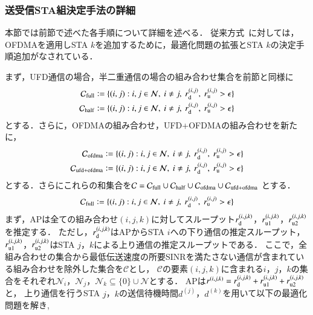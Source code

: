 \documentclass[master]{kuisthesis}		%
\newcommand{\sij}{(i,j)}
\def\coloneqq{\mathrel{\mathop:}=}
\newcommand{\sijk}{(i,j,k)}
\newcommand{\rijk}{r^{(i,j,k)}}
\newcommand{\mthc}{\mathcal C}
\newcommand{\mthni}{{\mathcal N}_i}
\newcommand{\mthnj}{{\mathcal N}_j}
\newcommand{\mthnk}{{\mathcal N}_k}
\begin{document}
		\subsubsection{送受信STA組決定手法の詳細}
			本節では前節で述べた各手順について詳細を述べる．
			従来方式~\cite{promac_fair}に対しては，OFDMAを適用しSTA $k$を追加するために，最適化問題の拡張とSTA $k$の決定手順追加がなされている．
			\par
			まず，UFD通信の場合，半二重通信の場合の組み合わせ集合を前節と同様に
			\begin{align}
				{\mathcal C}_{\rm full} \coloneqq \{\sij : i,j\in{\mathcal N},\ i\neq j,\ r^{\sij}_{\rm d},\ r^{\sij}_{\rm u}>\epsilon\} \label{eq:cfull}\\
				{\mathcal C}_{\rm half} \coloneqq \{\sij : i,j\in{\mathcal N},\ i\neq j,\ r^{\sij}_{\rm d},\ r^{\sij}_{\rm u}>\epsilon\} \label{eq:cfull}
			\end{align}
			とする．さらに，OFDMAの組み合わせ，UFD+OFDMAの組み合わせを新たに，
			\begin{align}
				{\mathcal C}_{\rm ofdma} \coloneqq \{\sij : i,j\in{\mathcal N},\ i\neq j,\ r^{\sij}_{\rm d},\ r^{\sij}_{\rm u}>\epsilon\} \label{eq:cfull}\\
				{\mathcal C}_{\rm ufd+ofdma} \coloneqq \{\sij : i,j\in{\mathcal N},\ i\neq j,\ r^{\sij}_{\rm d},\ r^{\sij}_{\rm u}>\epsilon\} \label{eq:cfull}
			\end{align}
			とする．さらにこれらの和集合を${\mathcal C} = {\mathcal C}_{\rm full} \cup {\mathcal C}_{\rm half}\cup {\mathcal C}_{\rm ofdma}\cup {\mathcal C}_{\rm ufd+ofdma}$
			とする．
			\begin{equation}
				{\mathcal C}_{\rm full} \coloneqq \{\sij : i,j\in{\mathcal N},\ i\neq j,\ r^{\sij}_{\rm d},\ r^{\sij}_{\rm u}>\epsilon\} \label{eq:cfull}
			\end{equation}
			まず，APは全ての組み合わせ$(i,j,k)$に対してスループット$r^{(i,j,k)}_{\rm d}$，$r^{(i,j,k)}_{\rm u1}$，$r^{(i,j,k)}_{\rm u2}$を推定する．
			ただし，$r^{(i,j,k)}_{\rm d}$はAPからSTA $i$への下り通信の推定スループット，$r^{(i,j,k)}_{\rm u1}$，$r^{(i,j,k)}_{\rm u2}$はSTA $j$，$k$による上り通信の推定スループットである．
			ここで，全組み合わせの集合から最低伝送速度の所要SINRを満たさない通信が含まれている組み合わせを除外した集合を$\mthc$とし，
			$\mthc$の要素$\sijk$に含まれる$i$，$j$，$k$の集合をそれぞれ$\mthni$，$\mthnj$，$\mthnk\subseteq \{0\}\cup{\mathcal N}$とする．
			APは$\rijk=r^{(i,j,k)}_{\rm d}+r^{(i,j,k)}_{\rm u1}+r^{(i,j,k)}_{\rm u2}$と，
			上り通信を行うSTA $j$，$k$の送信待機時間$d^{(j)}$，$d^{(k)}$を用いて以下の最適化問題を解き,
\end{document}
